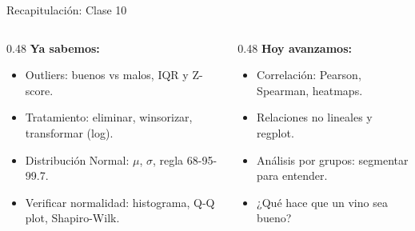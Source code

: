\documentclass[aspectratio=169, 11pt]{beamer}
\begin{document}
\begin{frame}[shrink=5]{Recapitulación: Clase 10}
  \vspace{-4pt}
  \begin{columns}[T]
    \begin{column}{0.48\textwidth}
      {\footnotesize\bfseries\color{arcaDark} Ya sabemos:}
      \vspace{4pt}

      {\footnotesize
      \begin{itemize}\setlength{\itemsep}{4pt}
        \item[{\color{codeGreen}\faCheckCircle}]
          Outliers: buenos vs malos, IQR y Z-score.
        \item[{\color{codeGreen}\faCheckCircle}]
          Tratamiento: eliminar, winsorizar, transformar (log).
        \item[{\color{codeGreen}\faCheckCircle}]
          Distribución Normal: $\mu$, $\sigma$, regla 68-95-99.7.
        \item[{\color{codeGreen}\faCheckCircle}]
          Verificar normalidad: histograma, Q-Q plot, Shapiro-Wilk.
      \end{itemize}
      }
    \end{column}

    \begin{column}{0.48\textwidth}
      {\footnotesize\bfseries\color{arcaRed} Hoy avanzamos:}
      \vspace{4pt}

      {\footnotesize
      \begin{itemize}\setlength{\itemsep}{4pt}
        \item[{\color{arcaRed}\faArrowRight}]
          Correlación: Pearson, Spearman, heatmaps.
        \item[{\color{arcaRed}\faArrowRight}]
          Relaciones no lineales y regplot.
        \item[{\color{arcaRed}\faArrowRight}]
          Análisis por grupos: segmentar para entender.
        \item[{\color{arcaRed}\faArrowRight}]
          ¿Qué hace que un vino sea bueno?
      \end{itemize}
      }
    \end{column}
  \end{columns}
\end{frame}
\end{document}
